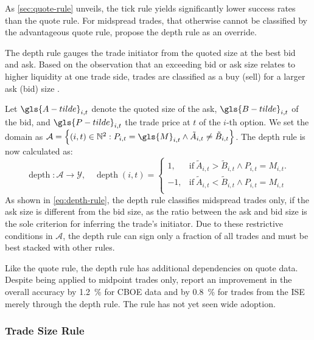 As \cref{sec:quote-rule} unveils, the tick rule yields significantly lower success rates than the quote rule. For midspread trades, that otherwise cannot be classified by the advantageous quote rule, \textcite[][14]{grauerOptionTradeClassification2022} propose the depth rule as an override.

The depth rule gauges the trade initiator from the quoted size at the best bid and ask. Based on the observation that an exceeding bid or ask size relates to higher liquidity at one trade side, trades are classified as a buy (sell) for a larger ask (bid) size \autocite[][14]{grauerOptionTradeClassification2022}.

Let $\gls{A-tilde}_{i,t}$ denote the quoted size of the ask, $\gls{B-tilde}_{i,t}$ of the bid, and $\gls{P-tilde}_{i,t}$ the trade price at $t$ of the $i$-th option. We set the domain as $\mathcal{A} = \left\{(i, t) \in \mathbb{N}^2: P_{i,t} = \gls{M}_{i,t} \land \tilde{A}_{i,t} \neq \tilde{B}_{i,t} \right\}$. The depth rule is now calculated as:
\begin{equation}
    \operatorname{depth} \colon \mathcal{A} \to \mathcal{Y},\quad
    \operatorname{depth}(i, t)=
    \begin{cases}
        1,  & \mathrm{if}\ \tilde{A}_{i,t} > \tilde{B}_{i,t} \land P_{i, t} = M_{i, t}. \\
        -1, & \mathrm{if}\ \tilde{A}_{i,t} < \tilde{B}_{i,t} \land P_{i, t} = M_{i, t}  \\
    \end{cases}
    \label{eq:depth-rule}
\end{equation}
As shown in \cref{eq:depth-rule}, the depth rule classifies midspread trades only, if the ask size is different from the bid size, as the ratio between the ask and bid size is the sole criterion for inferring the trade's initiator. Due to these restrictive conditions in $\mathcal{A}$, the depth rule can sign only a fraction of all trades and must be best stacked with other rules.

Like the quote rule, the depth rule has additional dependencies on quote data. Despite being applied to midpoint trades only, \textcite[][4]{grauerOptionTradeClassification2022} report an improvement in the overall accuracy by \SI{1.2}{\percent} for \gls{CBOE} data and by \SI{0.8}{\percent} for trades from the \gls{ISE} merely through the depth rule. The rule has not yet seen wide adoption.

\subsubsection{Trade Size Rule}\label{sec:trade-size-rule}

